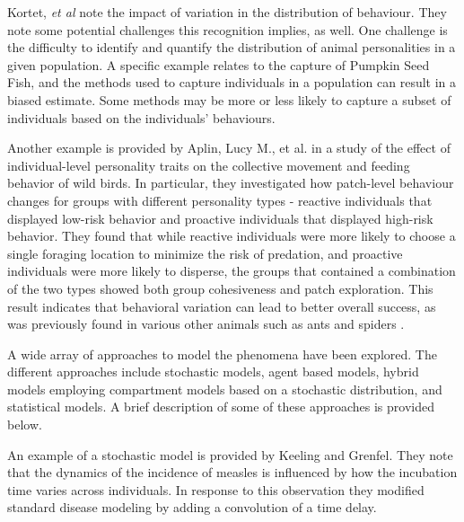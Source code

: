 \documentclass[review]{elsarticle}
\begin{document}
Kortet, \textit{et al}\cite{doi:10.1111/j.1461-0248.2010.01536.x} note
the impact of variation in the distribution of behaviour. They note
some potential challenges this recognition implies, as well. One
challenge is the difficulty to identify and quantify the distribution
of animal personalities in a given population. A specific example
relates to the capture of Pumpkin Seed
Fish\cite{doi:10.1037/0735-7036.107.3.250}, and the methods used to
capture individuals in a population can result in a biased estimate.
Some methods may be more or less likely to capture a subset of
individuals based on the individuals' behaviours.


Another example is provided by Aplin, Lucy M., et al. \cite{doi:10.1098/rspb.2014.1016} in a study of the effect of individual-level personality traits on the collective movement and feeding behavior of wild birds. In particular, they investigated how patch-level behaviour changes for groups with different personality types - reactive individuals that displayed low-risk behavior and proactive individuals that displayed high-risk behavior. They found that while reactive individuals were more likely to choose a single foraging location to minimize the risk of predation, and proactive individuals were more likely to disperse, the groups that contained a combination of the two types showed both group cohesiveness and patch exploration. This result indicates that behavioral variation can lead to better overall success, as was previously found in various other animals such as ants and spiders \cite{ doi:10.1086/687235,modlmeier2011productivity,modlmeier2012diverse}.

A wide array of approaches to model the phenomena have been
explored. The different approaches include stochastic
models\cite{Keeling65}, agent based models\cite{doi:10.1086/687235},
hybrid models employing compartment models based on a stochastic
distribution\cite{doi:10.1098/rspb.2001.1599}, and statistical
models\cite{SuperspreadingLloyd}. A brief description of some of these
approaches is provided below.

An example of a stochastic model is provided by Keeling and
Grenfel\cite{Keeling65}. They note that the dynamics of the incidence
of measles is influenced by how the incubation time varies across
individuals. In response to this observation they modified standard
disease modeling by adding a convolution of a time delay.
\end{document}
